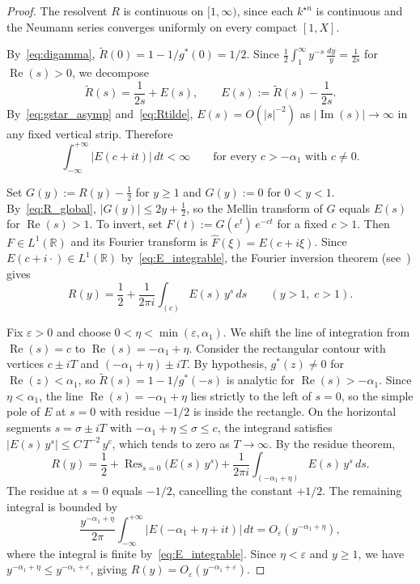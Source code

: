 \documentclass[11pt]{amsart}
\theoremstyle{definition}
\theoremstyle{remark}
\newcommand{\eps}{\varepsilon}
\newcommand{\Res}{\operatorname{Res}}
\newcommand{\Real}{\operatorname{Re}}
\newcommand{\Imag}{\operatorname{Im}}
\begin{document}
\begin{proof}
The resolvent $R$ is continuous on $[1,\infty)$, since each $k^{\star n}$ is continuous and the Neumann series converges uniformly on every compact $[1,X]$.

By~\eqref{eq:digamma}, $\widetilde{R}(0) = 1 - 1/g^*(0) = 1/2$. Since $\frac{1}{2} \int_1^\infty y^{-s}\, \frac{dy}{y} = \frac{1}{2s}$ for $\Real(s) > 0$, we decompose
$$
\widetilde{R}(s) = \frac{1}{2s} + E(s), \qquad E(s) := \widetilde{R}(s) - \frac{1}{2s}.
$$
By~\eqref{eq:gstar_asymp} and~\eqref{eq:Rtilde}, $E(s) = O(|s|^{-2})$ as $|\Imag(s)| \to \infty$ in any fixed vertical strip. Therefore
\begin{equation}\label{eq:E_integrable}
\int_{-\infty}^{+\infty} |E(c+it)|\, dt < \infty \qquad \text{for every } c > -\alpha_1 \text{ with } c \neq 0.
\end{equation}

Set $G(y) := R(y) - \frac{1}{2}$ for $y \geq 1$ and $G(y) := 0$ for $0 < y < 1$. By~\eqref{eq:R_global}, $|G(y)| \leq 2y + \frac{1}{2}$, so the Mellin transform of $G$ equals $E(s)$ for $\Real(s) > 1$. To invert, set $F(t) := G(e^t)\, e^{-ct}$ for a fixed $c > 1$. Then $F \in L^1(\mathbb{R})$ and its Fourier transform is $\widehat{F}(\xi) = E(c + i\xi)$. Since $E(c + i\cdot) \in L^1(\mathbb{R})$ by~\eqref{eq:E_integrable}, the Fourier inversion theorem (see~\cite[Chapter~7]{Folland}) gives
\begin{equation}\label{eq:mellin_inversion}
R(y) = \frac{1}{2} + \frac{1}{2\pi i} \int_{(c)} E(s)\, y^s\, ds \qquad (y > 1,\; c > 1).
\end{equation}

Fix $\eps > 0$ and choose $0 < \eta < \min(\eps, \alpha_1)$. We shift the line of integration from $\Real(s) = c$ to $\Real(s) = -\alpha_1 + \eta$. Consider the rectangular contour with vertices $c \pm iT$ and $(-\alpha_1 + \eta) \pm iT$. By hypothesis, $g^*(z) \neq 0$ for $\Real(z) < \alpha_1$, so $\widetilde{R}(s) = 1 - 1/g^*(-s)$ is analytic for $\Real(s) > -\alpha_1$. Since $\eta < \alpha_1$, the line $\Real(s) = -\alpha_1 + \eta$ lies strictly to the left of $s = 0$, so the simple pole of $E$ at $s = 0$ with residue $-1/2$ is inside the rectangle. On the horizontal segments $s = \sigma \pm iT$ with $-\alpha_1 + \eta \leq \sigma \leq c$, the integrand satisfies $|E(s)\, y^s| \leq C\, T^{-2}\, y^c$, which tends to zero as $T \to \infty$. By the residue theorem,
$$
R(y) = \frac{1}{2} + \Res_{s=0}\bigl(E(s)\, y^s\bigr) + \frac{1}{2\pi i} \int_{(-\alpha_1+\eta)} E(s)\, y^s\, ds.
$$
The residue at $s = 0$ equals $-1/2$, cancelling the constant $+1/2$. The remaining integral is bounded by
$$
\frac{y^{-\alpha_1+\eta}}{2\pi} \int_{-\infty}^{+\infty} |E(-\alpha_1+\eta+it)|\, dt = O_\eps(y^{-\alpha_1+\eta}),
$$
where the integral is finite by~\eqref{eq:E_integrable}. Since $\eta < \eps$ and $y \geq 1$, we have $y^{-\alpha_1+\eta} \leq y^{-\alpha_1+\eps}$, giving $R(y) = O_\eps(y^{-\alpha_1+\eps})$.
\end{proof}
\end{document}
